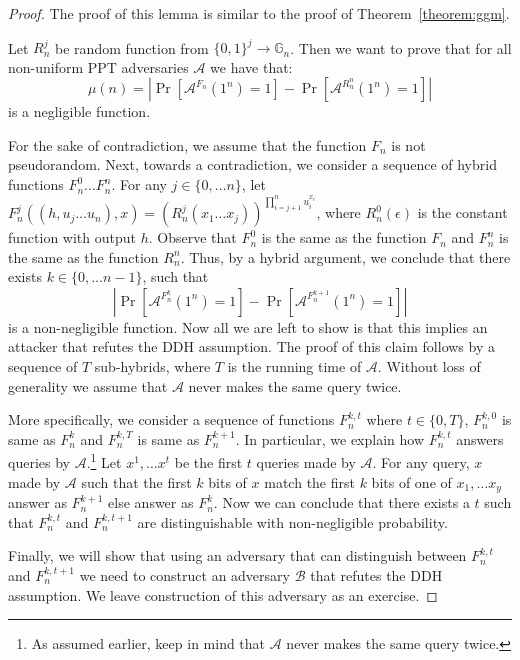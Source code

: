 \begin{proof}
The proof of this lemma is similar to the proof of Theorem~\ref{theorem:ggm}.

Let $R_n^j$ be random function from $\{0,1\}^j \rightarrow \mathbb{G}_n$. Then we want to prove that for all non-uniform PPT adversaries $\mathcal{A}$ we have that:
\[\mu(n) = \left|\Pr[\mathcal{A}^{F_n}(1^n) =1] -  \Pr[\mathcal{A}^{R_n^n}(1^n) =1]\right|\]
is a negligible function. 

For the sake of contradiction, we assume that the function $F_n$ is not pseudorandom. Next, towards a contradiction, we consider a sequence of hybrid functions $F_n^0 \ldots F_n^n$. 
For any $j \in \{0,\ldots n\}$, let $F^j_n((h,u_{j}\ldots u_n),x) = (R_n^j(x_1\ldots x_j))^{\prod_{i=j+1}^n u_i^{x_i}}$, where $R_n^0(\epsilon)$ is the constant function with output $h$. Observe that $F_n^0$ is the same as the function $F_n$ and $F_n^n$ is the same as the function $R_n^n$. Thus, by a hybrid argument, we conclude that there exists $k \in \{0,\ldots n-1\}$, such that 
\[\left|\Pr[\mathcal{A}^{F_n^k}(1^n) =1] -  \Pr[\mathcal{A}^{F_n^{k+1}}(1^n) =1]\right|\]
is a non-negligible function. Now all we are left to show is that this implies an attacker that refutes the DDH assumption. The proof of this claim follows by a sequence of $T$ sub-hybrids, where $T$ is the running time of $\mathcal{A}$. Without loss of generality we assume that $\mathcal{A}$ never makes the same query twice. 

More specifically, we consider a sequence of functions $F_n^{k,t}$ where $t \in \{0,T\}$, $F_n^{k,0}$ is same as $F_n^{k}$ and $F_n^{k,T}$ is same as $F_n^{k+1}$. In particular, we explain how $F_n^{k,t}$ answers queries by $\mathcal{A}$.\footnote{As assumed earlier, keep in mind that $\mathcal{A}$ never makes the same query twice.} Let $x^1, \ldots x^t$ be the first $t$ queries made by $\mathcal{A}$. For any query, $x$ made by $\mathcal{A}$ such that the first $k$ bits of $x$ match the first $k$ bits of one of $x_1, \ldots x_y$ answer as $F_n^{k+1}$ else answer as $F_n^{k}$. Now we can conclude that there exists a $t$ such that $F_n^{k,t}$ and $F_n^{k,t+1}$ are distinguishable with non-negligible probability. 

Finally, we will show that using an adversary that can distinguish between $F_n^{k,t}$ and $F_n^{k,t+1}$ we need to construct an adversary $\mathcal{B}$ that refutes the DDH assumption. We leave construction of this adversary as an exercise.
\end{proof}



